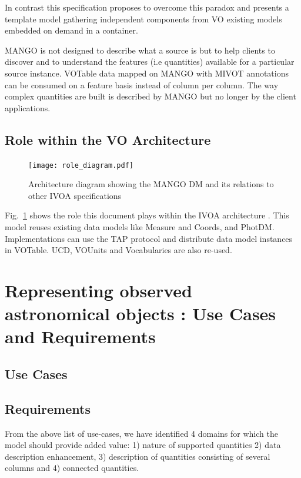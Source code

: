 \documentclass[11pt,a4paper]{ivoa}
\begin{document}
In contrast this specification proposes to overcome this paradox and presents a template model gathering independent
components from VO existing models embedded on demand in a container.

MANGO is not designed to describe what a source is but to help clients to discover and to understand
the features (i.e quantities) available for a particular source instance.
VOTable data mapped on MANGO with MIVOT \citep{2023ivoa.spec.0620M} annotations can be consumed on a feature basis 
instead of column per column.
The way complex quantities are built is described by MANGO but no longer by the client applications.

\subsection{Role within the VO Architecture}

\begin{figure}
\centering

\texttt{[image: role\_diagram.pdf]}
\caption{Architecture diagram showing the MANGO DM and its relations to other IVOA specifications}
\label{fig:archdiag}
\end{figure}

Fig.~\ref{fig:archdiag} shows the role this document plays within the
IVOA architecture \citep{2010ivoa.rept.1123A}. This model reuses existing data models like Measure and Coords, and PhotDM. Implementations can use the TAP protocol and distribute data model instances in VOTable. 
UCD, VOUnits and Vocabularies are also re-used.  

\section{Representing observed astronomical objects : Use Cases and  Requirements}

\subsection{Use Cases}



\subsection{Requirements}

From the above list of use-cases, we have identified 4 domains for which
the model should provide added value: 1) nature of supported quantities 2) data description enhancement,
3) description of quantities consisting of several columns and 4) connected quantities.
\end{document}
